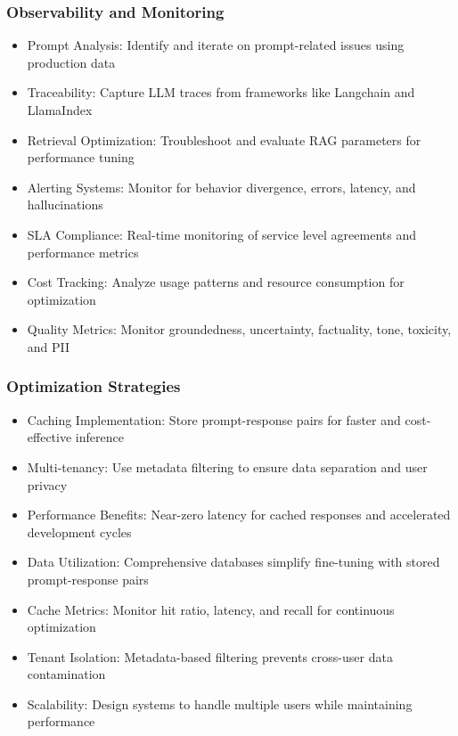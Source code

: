 \begin{frame}[fragile]\frametitle{Observability and Monitoring}
      \begin{itemize}
        \item Prompt Analysis: Identify and iterate on prompt-related issues using production data
        \item Traceability: Capture LLM traces from frameworks like Langchain and LlamaIndex
        \item Retrieval Optimization: Troubleshoot and evaluate RAG parameters for performance tuning
        \item Alerting Systems: Monitor for behavior divergence, errors, latency, and hallucinations
        \item SLA Compliance: Real-time monitoring of service level agreements and performance metrics
        \item Cost Tracking: Analyze usage patterns and resource consumption for optimization
        \item Quality Metrics: Monitor groundedness, uncertainty, factuality, tone, toxicity, and PII
      \end{itemize}
\end{frame}

\begin{frame}[fragile]\frametitle{Optimization Strategies}
      \begin{itemize}
        \item Caching Implementation: Store prompt-response pairs for faster and cost-effective inference
        \item Multi-tenancy: Use metadata filtering to ensure data separation and user privacy
        \item Performance Benefits: Near-zero latency for cached responses and accelerated development cycles
        \item Data Utilization: Comprehensive databases simplify fine-tuning with stored prompt-response pairs
        \item Cache Metrics: Monitor hit ratio, latency, and recall for continuous optimization
        \item Tenant Isolation: Metadata-based filtering prevents cross-user data contamination
        \item Scalability: Design systems to handle multiple users while maintaining performance
      \end{itemize}
\end{frame}

